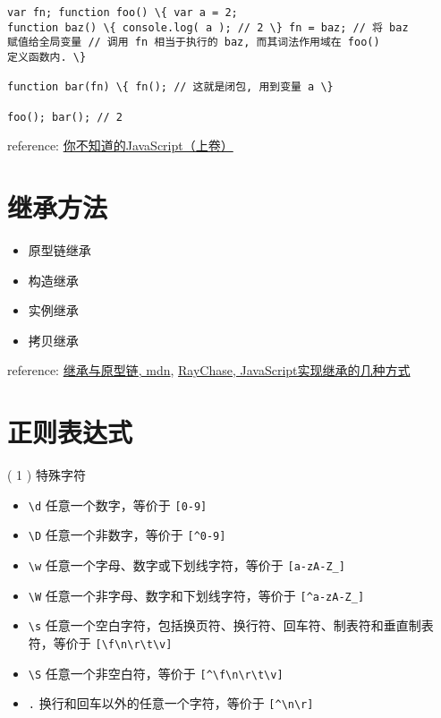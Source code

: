 \begin{verbatim}var fn; function foo() \{ var a = 2;
function baz() \{ console.log( a ); // 2 \} fn = baz; // 将 baz
赋值给全局变量 // 调用 fn 相当于执行的 baz, 而其词法作用域在 foo()
定义函数内. \}

function bar(fn) \{ fn(); // 这就是闭包, 用到变量 a \}

foo(); bar(); // 2 
\end{verbatim}

reference:
\href{http://book.douban.com/subject/26351021/}{你不知道的JavaScript（上卷）}

\section{继承方法}\label{ux7ee7ux627fux65b9ux6cd5}

\begin{itemize}
\tightlist
\item
  原型链继承
\item
  构造继承
\item
  实例继承
\item
  拷贝继承
\end{itemize}

reference:
\href{https://developer.mozilla.org/zh-CN/docs/Web/JavaScript/Inheritance_and_the_prototype_chain}{继承与原型链,
mdn}, \href{http://raychase.iteye.com/blog/1337415}{RayChase,
JavaScript实现继承的几种方式}

\section{正则表达式}\label{ux6b63ux5219ux8868ux8fbeux5f0f}

( 1 ) 特殊字符

\begin{itemize}
\tightlist
\item
  \texttt{\textbackslash{}d} 任意一个数字，等价于 \texttt{{[}0-9{]}}
\item
  \texttt{\textbackslash{}D} 任意一个非数字，等价于
  \texttt{{[}\^{}0-9{]}}
\item
  \texttt{\textbackslash{}w} 任意一个字母、数字或下划线字符，等价于
  \texttt{{[}a-zA-Z\_{]}}
\item
  \texttt{\textbackslash{}W} 任意一个非字母、数字和下划线字符，等价于
  \texttt{{[}\^{}a-zA-Z\_{]}}
\item
  \texttt{\textbackslash{}s}
  任意一个空白字符，包括换页符、换行符、回车符、制表符和垂直制表符，等价于
  \texttt{{[}\textbackslash{}f\textbackslash{}n\textbackslash{}r\textbackslash{}t\textbackslash{}v{]}}
\item
  \texttt{\textbackslash{}S} 任意一个非空白符，等价于
  \texttt{{[}\^{}\textbackslash{}f\textbackslash{}n\textbackslash{}r\textbackslash{}t\textbackslash{}v{]}}
\item
  \texttt{.} 换行和回车以外的任意一个字符，等价于
  \texttt{{[}\^{}\textbackslash{}n\textbackslash{}r{]}}
\end{itemize}

